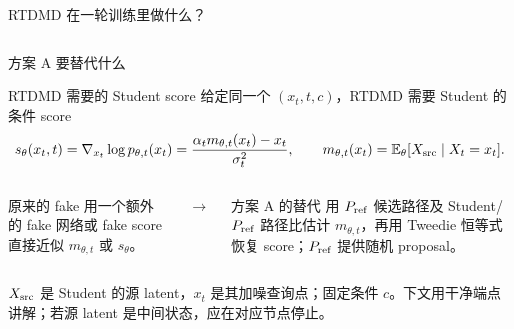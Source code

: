 \documentclass[10pt,aspectratio=169]{beamer}
\newcommand{\E}{\mathbb E}
\begin{document}
\begin{frame}{RTDMD 在一轮训练里做什么？}
\begin{columns}[T,onlytextwidth]
\end{columns}
\end{frame}

\begin{frame}{方案 A 要替代什么}
\begin{block}{RTDMD 需要的 Student score}
给定同一个 $(x_t,t,c)$，RTDMD 需要 Student 的条件 score
\begin{equation}\label{eq:student-target}
 s_\theta(x_t,t)=\nabla_{x_t}\log p_{\theta,t}(x_t)
 =\frac{\alpha_t m_{\theta,t}(x_t)-x_t}{\sigma_t^2},
 \qquad m_{\theta,t}(x_t)=\E_\theta[X_{\rm src}\mid X_t=x_t].
\end{equation}
\end{block}
\begin{columns}[T,onlytextwidth]
\begin{alertblock}{原来的 fake}
用一个额外的 fake 网络或 fake score 直接近似 $m_{\theta,t}$ 或 $s_\theta$。
\end{alertblock}
\centering\Large $\longrightarrow$
\begin{exampleblock}{方案 A 的替代}
用 \ensuremath{P_{\rm ref}} 候选路径及 Student/\ensuremath{P_{\rm ref}} 路径比估计 $m_{\theta,t}$，再用 Tweedie 恒等式恢复 score；\ensuremath{P_{\rm ref}} 提供随机 proposal。
\end{exampleblock}
\end{columns}
{\small $X_{\rm src}$ 是 Student 的源 latent，$x_t$ 是其加噪查询点；固定条件 $c$。下文用干净端点讲解；若源 latent 是中间状态，应在对应节点停止。}\par

\end{frame}
\end{document}
